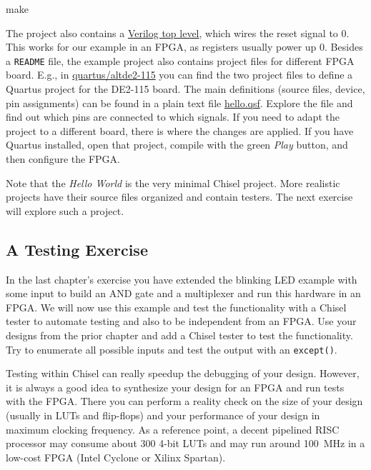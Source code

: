 \documentclass[%
    10pt, %
    headinclude, footexclude,
    openright, %
    notitlepage,
    cleardoubleempty,
    headsepline,
    pointlessnumbers,
    bibtotoc, idxtotoc,
    ]{scrbook}
\newcommand{\code}[1]{{\small{\texttt{#1}}}}
\newcommand{\myref}[2]{\href{#1}{#2}}
\begin{document}
\begin{chisel}
make
\end{chisel}

The project also contains a
\myref{https://github.com/schoeberl/chisel-examples/blob/master/hello-world/verilog/hello_top.v}{Verilog top level},
which wires the reset signal to 0.
This works for our example in an FPGA, as registers usually power up 0.
Besides a \code{README} file, the example project also contains project
files for different FPGA board. E.g., in
\myref{https://github.com/schoeberl/chisel-examples/tree/master/hello-world/quartus/altde2-115}{quartus/altde2-115} 
you can find the two project files to define a Quartus project for the DE2-115 board.
The main definitions (source files, device, pin assignments) can be found in a plain text file
\myref{https://github.com/schoeberl/chisel-examples/blob/master/hello-world/quartus/altde2-115/hello.qsf}{hello.qsf}.
Explore the file and find out which pins are connected to which signals.
If you need to adapt the project to a different board, there is where the changes are applied.
If you have Quartus installed, open that project, compile with the green \emph{Play} button,
and then configure the FPGA.

Note that the \emph{Hello World} is the very minimal Chisel project.
More realistic projects have their source files organized and contain testers.
The next exercise will explore such a project.

\subsection{A Testing Exercise}

In the last chapter's exercise you have extended the blinking LED example with some input
to build an AND gate and a multiplexer and run this hardware in an FPGA.
We will now use this example and test the functionality with a Chisel tester
to automate testing and also to be independent from an FPGA.
Use your designs from the prior chapter and add a Chisel tester to test the functionality.
Try to enumerate all possible inputs and test the output with an \code{except()}.

Testing within Chisel can really speedup the debugging of your design.
However, it is always a good idea to synthesize your design for an FPGA and run tests
with the FPGA. There you can perform a reality check on the size of your design (usually
in LUTs and flip-flops) and your performance of your design in maximum clocking frequency.
As a reference point, a decent pipelined RISC processor may consume about 300
4-bit LUTs and may run around 100~MHz in a low-cost FPGA (Intel Cyclone or
Xilinx Spartan).
\end{document}
